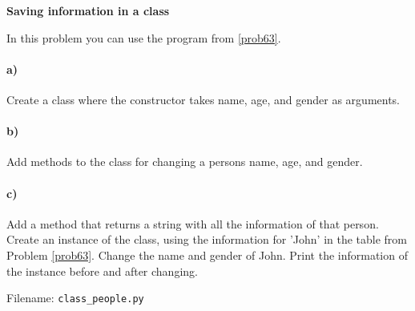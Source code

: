 
\begin{Problem}{\textbf{Saving information in a class}} \label{prob71}

\noindent In this problem you can use the program from \ref{prob63}.

\paragraph{a)}
Create a class  where the constructor takes name, age, and gender as arguments.

\paragraph{b)}
Add methods to the class for changing a persons name, age, and gender.

\paragraph{c)}
Add a method  that returns a string with all the information of that person. Create an instance of the class, using the
information for 'John' in the table from Problem \ref{prob63}.
Change the name and gender of John. Print the information of the instance before and after changing.

Filename: \texttt{class\_people.py}
\end{Problem}


